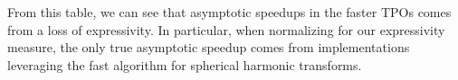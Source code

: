 \documentclass{article}
\renewcommand{\O}{\mathcal{O}}
\theoremstyle{definition}
\theoremstyle{remark}
\begin{document}

From this table, we can see that asymptotic speedups in the faster TPOs comes from a loss of expressivity. In particular, when normalizing for our expressivity measure, the only true asymptotic speedup comes from implementations leveraging the fast algorithm for spherical harmonic transforms.
\end{document}
